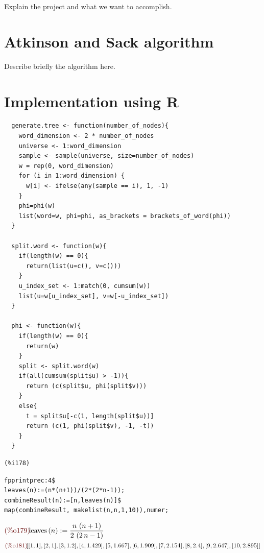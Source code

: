 Explain the project and what we want to accomplish.

\section{Atkinson and Sack algorithm}
Describe briefly the algorithm here.

\section{Implementation using R}

\begin{lstlisting}
  generate.tree <- function(number_of_nodes){
    word_dimension <- 2 * number_of_nodes    
    universe <- 1:word_dimension
    sample <- sample(universe, size=number_of_nodes)
    w = rep(0, word_dimension)
    for (i in 1:word_dimension) {
      w[i] <- ifelse(any(sample == i), 1, -1)
    }    
    phi=phi(w)
    list(word=w, phi=phi, as_brackets = brackets_of_word(phi))
  }

  split.word <- function(w){
    if(length(w) == 0){
      return(list(u=c(), v=c()))
    }    
    u_index_set <- 1:match(0, cumsum(w))
    list(u=w[u_index_set], v=w[-u_index_set])
  }

  phi <- function(w){
    if(length(w) == 0){
      return(w)
    }    
    split <- split.word(w)     
    if(all(cumsum(split$u) > -1)){
      return (c(split$u, phi(split$v)))
    }
    else{
      t = split$u[-c(1, length(split$u))]
      return (c(1, phi(split$v), -1, -t))
    }
  }
\end{lstlisting}



\noindent
\begin{minipage}[t]{8ex}{\color{red}\bf
\begin{verbatim}
(%i178) 
\end{verbatim}}
\end{minipage}
\begin{minipage}[t]{\textwidth}{\color{blue}
\begin{verbatim}
fpprintprec:4$
leaves(n):=(n*(n+1))/(2*(2*n-1));
combineResult(n):=[n,leaves(n)]$
map(combineResult, makelist(n,n,1,10)),numer;
\end{verbatim}}
\end{minipage}
\begin{math}\displaystyle
\parbox{8ex}{\color{labelcolor}(\%o179) }
\mathrm{leaves}\left( n\right) :=\frac{n\,\left( n+1\right)
}{2\,\left( 2\,n-1\right) }
\end{math}\\
\begin{math}\displaystyle
\parbox{8ex}{\color{labelcolor}(\%o181) }
[[1,1],[2,1],[3,1.2],[4,1.429],[5,1.667],[6,1.909],[7,2.154],[8,2.4],[9,2.647],[10,2.895]]
\end{math}


